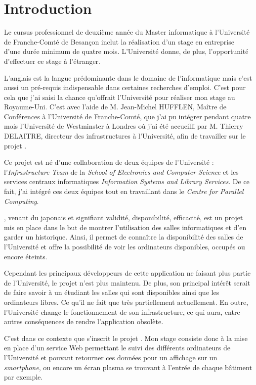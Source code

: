 \chapter{Introduction}

Le cursus professionnel de deuxi\`eme ann\'ee du Master informatique \`a l'Universit\'e de Franche-Comt\'e de Besan\c{c}on inclut la r\'ealisation d'un stage en entreprise d'une dur\'ee minimum de quatre mois. 
L'Universit\'e donne, de plus, l'opportunit\'e d'effectuer ce stage \`a l'\'etranger.

L'anglais est la langue pr\'edominante dans le domaine de l'informatique mais c'est aussi un pr\'e-requis indispensable dans certaines recherches d'emploi.
C'est pour cela que j'ai saisi la chance qu'offrait l'Universit\'e pour r\'ealiser mon stage au Royaume-Uni. 
C'est avec l'aide de M. Jean-Michel HUFFLEN, Ma\^itre de Conf\'erences \`a l'Universit\'e de Franche-Comt\'e, que j'ai pu int\'egrer pendant quatre mois l'Universit\'e de Westminster \`a Londres o\`u j'ai \'et\'e accueilli par M. Thierry DELAITRE, directeur des infrastructures \`a l'Universit\'e, afin de travailler sur le projet \YuukouII.

Ce projet est n\'e d'une collaboration de deux \'equipes de l'Universit\'e : l'\textit{Infrastructure Team} de la \textit{School of Electronics and Computer Science} et les services centraux informatiques \textit{Information Systems and Library Services}. 
De ce fait, j'ai int\'egr\'e ces deux \'equipes tout en travaillant dans le \textit{Centre for Parallel Computing}.

\Yuukou, venant du japonais et signifiant validit\'e, disponibilit\'e, efficacit\'e, est un projet mis en place dans le but de montrer l'utilisation des salles informatiques et d'en garder un historique.
Ainsi, il permet de conna\^itre la disponibilit\'e des salles de l'Universit\'e et offre la possibilit\'e de voir les ordinateurs disponibles, occup\'es ou encore \'eteints.

Cependant les principaux d\'eveloppeurs de cette application ne faisant plus partie de l'Universit\'e, le projet n'est plus maintenu.
De plus, son principal int\'er\^et serait de faire savoir \`a un \'etudiant les salles qui sont disponibles ainsi que les ordinateurs libres.
Ce qu'il ne fait que tr\`es partiellement actuellement.
En outre, l'Universit\'e change le fonctionnement de son infrastructure, ce qui aura, entre autres cons\'equences de rendre l'application obsol\`ete.

C'est dans ce contexte que s'inscrit le projet \YuukouII. 
Mon stage consiste donc \`a la mise en place d'un service Web permettant le suivi des diff\'erents ordinateurs de l'Universit\'e et pouvant retourner ces donn\'ees pour un affichage sur un \textit{smartphone}, ou encore un \'ecran plasma se trouvant \`a l'entr\'ee de chaque b\^atiment par exemple.

